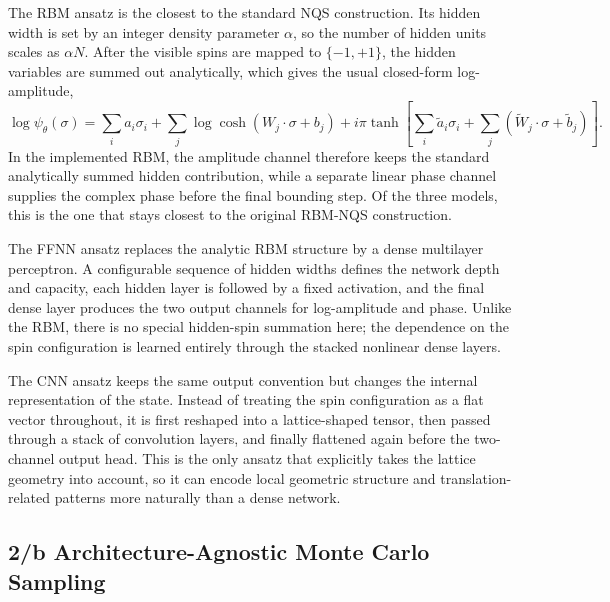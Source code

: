 \documentclass[11pt,a4paper]{article}
\begin{document}
The RBM ansatz is the closest to the standard NQS construction. Its hidden width is set by an integer density parameter $\alpha$, so the number of hidden units scales as $\alpha N$. After the visible spins are mapped to $\{-1,+1\}$, the hidden variables are summed out analytically, which gives the usual closed-form log-amplitude,
\begin{equation}
    \log \psi_\theta(\sigma)
    =
    \sum_i a_i \sigma_i
    +
    \sum_j \log \cosh\!\left(W_j \cdot \sigma + b_j\right)
    +
    i \pi \tanh \!\left[
        \sum_i \tilde{a}_i \sigma_i
        +
        \sum_j \left(\tilde{W}_j \cdot \sigma + \tilde{b}_j\right)
    \right].
\end{equation}
In the implemented RBM, the amplitude channel therefore keeps the standard analytically summed hidden contribution, while a separate linear phase channel supplies the complex phase before the final bounding step. Of the three models, this is the one that stays closest to the original RBM-NQS construction.

The FFNN ansatz replaces the analytic RBM structure by a dense multilayer perceptron. A configurable sequence of hidden widths defines the network depth and capacity, each hidden layer is followed by a fixed activation, and the final dense layer produces the two output channels for log-amplitude and phase. Unlike the RBM, there is no special hidden-spin summation here; the dependence on the spin configuration is learned entirely through the stacked nonlinear dense layers.

The CNN ansatz keeps the same output convention but changes the internal representation of the state. Instead of treating the spin configuration as a flat vector throughout, it is first reshaped into a lattice-shaped tensor, then passed through a stack of convolution layers, and finally flattened again before the two-channel output head. This is the only ansatz that explicitly takes the lattice geometry into account, so it can encode local geometric structure and translation-related patterns more naturally than a dense network.

\subsection*{2/b Architecture-Agnostic Monte Carlo Sampling}
\end{document}
